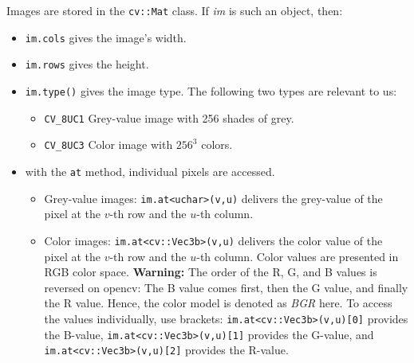\documentclass[a4paper, 11pt]{article}
\newcommand{\code}[1]{\texttt{#1}}
\begin{document}
Images are stored in the \texttt{cv::Mat} class. If \textit{im} is such an object, then:
\begin{itemize}
\item \texttt{im.cols} gives the image’s width.
\item \texttt{im.rows} gives the height.
\item \texttt{im.type()} gives the image type. The following two types are relevant to us:
\begin{itemize}
\item \texttt{CV\_8UC1} Grey-value image with 256 shades of grey.
\item \texttt{CV\_8UC3} Color image with $256^3$ colors.
\end{itemize}
\item with the \texttt{at} method, individual pixels are accessed.
\begin{itemize}
\item Grey-value images: \texttt{im.at<uchar>(v,u)} delivers the grey-value of the pixel at the $v$-th row and the $u$-th column.
\item Color images: \texttt{im.at<cv::Vec3b>(v,u)} delivers the color value of the pixel at the $v$-th row and the $u$-th column. Color values are presented in RGB color space. \textbf{Warning:} The order of the R, G, and B values is reversed on opencv: The B value comes first, then the G value, and finally the R value. Hence, the color model is denoted as \textit{BGR} here. To access the values individually, use brackets:
\texttt{im.at<cv::Vec3b>(v,u)[0]} provides the B-value, \texttt{im.at<cv::Vec3b>(v,u)[1]} provides the G-value, and \texttt{im.at<cv::Vec3b>(v,u)[2]} provides the R-value.
\end{itemize}
\end{itemize}

%
\end{document}
